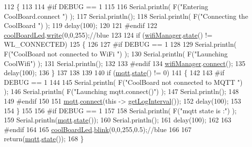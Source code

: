\begin{DoxyCode}
112 \{
113 
114 \textcolor{preprocessor}{#if DEBUG == 1  }
115 
116     Serial.println( F(\textcolor{stringliteral}{"Entering CoolBoard.connect "}) );
117     Serial.println();
118     Serial.println( F(\textcolor{stringliteral}{"Connecting the CoolBoard  "}) );
119     delay(100);
120 
121 \textcolor{preprocessor}{#endif}
122     \hyperlink{classCoolBoard_a1b1d3c684a5baa56b08486e192fd8e97}{coolBoardLed}.\hyperlink{classCoolBoardLed_a30fadd4cbec17ceea428bf7a32207e87}{write}(0,0,255);\textcolor{comment}{//blue}
123 
124     \textcolor{keywordflow}{if} (\hyperlink{classCoolBoard_acd88e6003606b47479ebba81e4aceeca}{wifiManager}.\hyperlink{classCoolWifi_a1c7b4d82a4098d346e7593dce92039fa}{state}() != WL\_CONNECTED)
125     \{       
126     
127 \textcolor{preprocessor}{    #if DEBUG == 1      }
128 
129         Serial.println( F(\textcolor{stringliteral}{"CoolBoard not connected to WiFi "}) );
130         Serial.println( F(\textcolor{stringliteral}{"Launching CoolWifi"}) );
131         Serial.println();
132 
133 \textcolor{preprocessor}{    #endif}
134         \hyperlink{classCoolBoard_acd88e6003606b47479ebba81e4aceeca}{wifiManager}.\hyperlink{classCoolWifi_ad060353050f40d032a2dbf9e54a768bf}{connect}();
135         delay(100);
136     \}
137 
138 
139     
140     \textcolor{keywordflow}{if} (\hyperlink{classCoolBoard_a2399f44d7c23c1149a335cb3b46d90f1}{mqtt}.\hyperlink{classCoolMQTT_a5d003307eff78efbd585e42b43b72b6d}{state}() != 0)
141     \{   
142     
143 \textcolor{preprocessor}{    #if DEBUG == 1  }
144     
145         Serial.println( F(\textcolor{stringliteral}{"CoolBoard not connected to MQTT "}) );
146         Serial.println( F(\textcolor{stringliteral}{"Launching mqtt.connect()"}) );
147         Serial.println();
148 
149 \textcolor{preprocessor}{    #endif  }
150     
151         \hyperlink{classCoolBoard_a2399f44d7c23c1149a335cb3b46d90f1}{mqtt}.\hyperlink{classCoolMQTT_a50075d0ab23a327ab897fd6adad20eda}{connect}(\textcolor{keyword}{this} -> \hyperlink{classCoolBoard_aaa24480b273fc095a1356a589c333781}{getLogInterval}());
152         delay(100);
153         
154     \}
155     
156 \textcolor{preprocessor}{#if DEBUG == 1}
157 
158     Serial.println( F(\textcolor{stringliteral}{"mqtt state is :"}) );
159     Serial.println(\hyperlink{classCoolBoard_a2399f44d7c23c1149a335cb3b46d90f1}{mqtt}.\hyperlink{classCoolMQTT_a5d003307eff78efbd585e42b43b72b6d}{state}());
160     Serial.println();
161     delay(100);
162 
163 \textcolor{preprocessor}{#endif}
164 
165     \hyperlink{classCoolBoard_a1b1d3c684a5baa56b08486e192fd8e97}{coolBoardLed}.\hyperlink{classCoolBoardLed_a96e1ea13003eee34c9dbcef340404426}{blink}(0,0,255,0.5);\textcolor{comment}{//blue}
166 
167     \textcolor{keywordflow}{return}(\hyperlink{classCoolBoard_a2399f44d7c23c1149a335cb3b46d90f1}{mqtt}.\hyperlink{classCoolMQTT_a5d003307eff78efbd585e42b43b72b6d}{state}());
168 \}
\end{DoxyCode}
